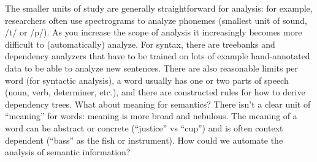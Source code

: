 The smaller units of study are generally straightforward for analysis: for example, researchers often use spectrograms to analyze phonemes (smallest unit of sound, /t/ or /p/). As you increase the scope of analysis it increasingly becomes more difficult to (automatically) analyze. For syntax, there are treebanks and dependency analyzers that have to be trained on lots of example hand-annotated data to be able to analyze new sentences. There are also reasonable limits per word (for syntactic analysis), a word usually has one or two parts of speech (noun, verb, determiner, etc.), and there are constructed rules for how to derive dependency trees. What about meaning for semantics? There isn't a clear unit of ``meaning'' for words: meaning is more broad and nebulous. The meaning of a word can be abstract or concrete (``justice'' vs ``cup'') and is often context dependent (``bass'' as the fish or instrument). How could we automate the analysis of semantic information?



%
%
%
%

